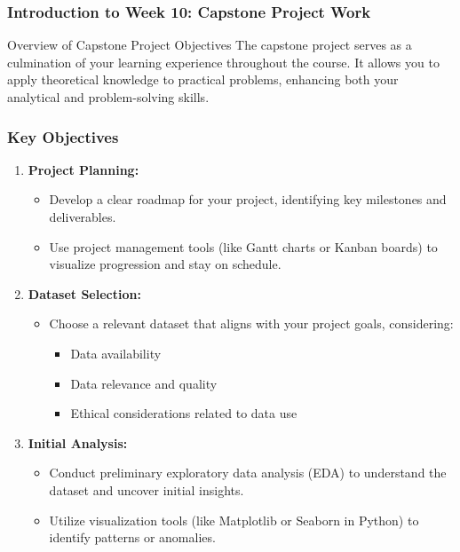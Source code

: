 \documentclass[aspectratio=169]{beamer}
\begin{document}
\frame{\titlepage}

\begin{frame}[fragile]
    \frametitle{Introduction to Week 10: Capstone Project Work}
    \begin{block}{Overview of Capstone Project Objectives}
        The capstone project serves as a culmination of your learning experience throughout the course. It allows you to apply theoretical knowledge to practical problems, enhancing both your analytical and problem-solving skills.
    \end{block}
\end{frame}

\begin{frame}[fragile]
    \frametitle{Key Objectives}
    \begin{enumerate}
        \item \textbf{Project Planning:}
        \begin{itemize}
            \item Develop a clear roadmap for your project, identifying key milestones and deliverables.
            \item Use project management tools (like Gantt charts or Kanban boards) to visualize progression and stay on schedule.
        \end{itemize}
        \item \textbf{Dataset Selection:}
        \begin{itemize}
            \item Choose a relevant dataset that aligns with your project goals, considering:
                \begin{itemize}
                    \item Data availability
                    \item Data relevance and quality
                    \item Ethical considerations related to data use
                \end{itemize}
        \end{itemize}
        \item \textbf{Initial Analysis:}
        \begin{itemize}
            \item Conduct preliminary exploratory data analysis (EDA) to understand the dataset and uncover initial insights.
            \item Utilize visualization tools (like Matplotlib or Seaborn in Python) to identify patterns or anomalies.
        \end{itemize}
    \end{enumerate}
\end{frame}
\end{document}
